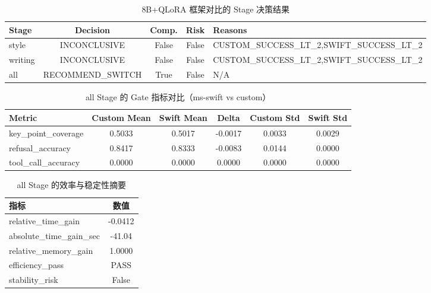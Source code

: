 \begin{table}[htbp]
  \centering
  \caption{8B+QLoRA 框架对比的 Stage 决策结果}
  \label{tab:framework-compare-stage-decision}
  \small
  \begin{tabular}{lccc p{5.5cm}}
    \toprule
    Stage & Decision & Comp. & Risk & Reasons \\
    \midrule
    style & INCONCLUSIVE & False & False & CUSTOM\_SUCCESS\_LT\_2,\newline SWIFT\_SUCCESS\_LT\_2 \\
    writing & INCONCLUSIVE & False & False & CUSTOM\_SUCCESS\_LT\_2,\newline SWIFT\_SUCCESS\_LT\_2 \\
    all & RECOMMEND\_SWITCH & True & False & N/A \\
    \bottomrule
  \end{tabular}
\end{table}

\begin{table}[htbp]
  \centering
  \caption{all Stage 的 Gate 指标对比（ms-swift vs custom）}
  \label{tab:framework-compare-all-gate}
  \small
  \begin{tabular}{lccccc}
    \toprule
    Metric & Custom Mean & Swift Mean & Delta & Custom Std & Swift Std \\
    \midrule
    key\_point\_coverage & 0.5033 & 0.5017 & -0.0017 & 0.0033 & 0.0029 \\
    refusal\_accuracy & 0.8417 & 0.8333 & -0.0083 & 0.0144 & 0.0000 \\
    tool\_call\_accuracy & 0.0000 & 0.0000 & 0.0000 & 0.0000 & 0.0000 \\
    \bottomrule
  \end{tabular}
\end{table}

\begin{table}[htbp]
  \centering
  \caption{all Stage 的效率与稳定性摘要}
  \label{tab:framework-compare-efficiency}
  \begin{tabular}{lc}
    \toprule
    指标 & 数值 \\
    \midrule
    relative\_time\_gain & -0.0412 \\
    absolute\_time\_gain\_sec & -41.04 \\
    relative\_memory\_gain & 1.0000 \\
    efficiency\_pass & PASS \\
    stability\_risk & False \\
    \bottomrule
  \end{tabular}
\end{table}


